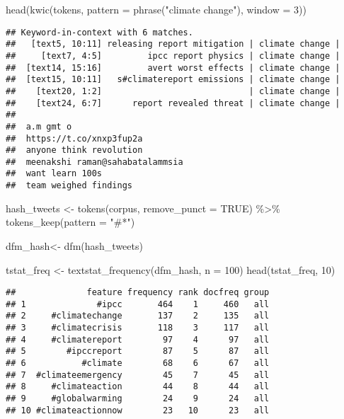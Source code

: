 \documentclass[
]{article}
\newenvironment{Shaded}{\begin{snugshade}}{\end{snugshade}}
\newcommand{\AttributeTok}[1]{\textcolor[rgb]{0.77,0.63,0.00}{#1}}
\newcommand{\ConstantTok}[1]{\textcolor[rgb]{0.00,0.00,0.00}{#1}}
\newcommand{\DecValTok}[1]{\textcolor[rgb]{0.00,0.00,0.81}{#1}}
\newcommand{\FunctionTok}[1]{\textcolor[rgb]{0.00,0.00,0.00}{#1}}
\newcommand{\NormalTok}[1]{#1}
\newcommand{\OtherTok}[1]{\textcolor[rgb]{0.56,0.35,0.01}{#1}}
\newcommand{\SpecialCharTok}[1]{\textcolor[rgb]{0.00,0.00,0.00}{#1}}
\newcommand{\StringTok}[1]{\textcolor[rgb]{0.31,0.60,0.02}{#1}}
\begin{document}
\begin{Shaded}
\begin{Highlighting}[]
\FunctionTok{head}\NormalTok{(}\FunctionTok{kwic}\NormalTok{(tokens, }\AttributeTok{pattern =} \FunctionTok{phrase}\NormalTok{(}\StringTok{"climate change"}\NormalTok{), }\AttributeTok{window =} \DecValTok{3}\NormalTok{))}
\end{Highlighting}
\end{Shaded}

\begin{verbatim}
## Keyword-in-context with 6 matches.                                                               
##   [text5, 10:11] releasing report mitigation | climate change |
##     [text7, 4:5]         ipcc report physics | climate change |
##  [text14, 15:16]         avert worst effects | climate change |
##  [text15, 10:11]   s#climatereport emissions | climate change |
##    [text20, 1:2]                             | climate change |
##    [text24, 6:7]      report revealed threat | climate change |
##                                 
##  a.m gmt o                      
##  https://t.co/xnxp3fup2a        
##  anyone think revolution        
##  meenakshi raman@sahabatalammsia
##  want learn 100s                
##  team weighed findings
\end{verbatim}

\begin{Shaded}
\begin{Highlighting}[]
\NormalTok{hash\_tweets }\OtherTok{\textless{}{-}} \FunctionTok{tokens}\NormalTok{(corpus, }\AttributeTok{remove\_punct =} \ConstantTok{TRUE}\NormalTok{) }\SpecialCharTok{\%\textgreater{}\%} 
               \FunctionTok{tokens\_keep}\NormalTok{(}\AttributeTok{pattern =} \StringTok{"\#*"}\NormalTok{)}

\NormalTok{dfm\_hash}\OtherTok{\textless{}{-}} \FunctionTok{dfm}\NormalTok{(hash\_tweets)}

\NormalTok{tstat\_freq }\OtherTok{\textless{}{-}} \FunctionTok{textstat\_frequency}\NormalTok{(dfm\_hash, }\AttributeTok{n =} \DecValTok{100}\NormalTok{)}
\FunctionTok{head}\NormalTok{(tstat\_freq, }\DecValTok{10}\NormalTok{)}
\end{Highlighting}
\end{Shaded}

\begin{verbatim}
##              feature frequency rank docfreq group
## 1              #ipcc       464    1     460   all
## 2     #climatechange       137    2     135   all
## 3     #climatecrisis       118    3     117   all
## 4     #climatereport        97    4      97   all
## 5        #ipccreport        87    5      87   all
## 6           #climate        68    6      67   all
## 7  #climateemergency        45    7      45   all
## 8     #climateaction        44    8      44   all
## 9     #globalwarming        24    9      24   all
## 10 #climateactionnow        23   10      23   all
\end{verbatim}
\end{document}
